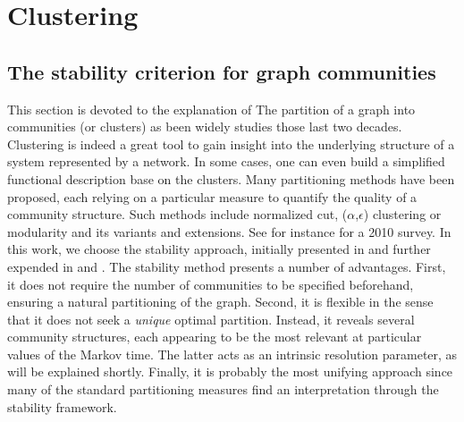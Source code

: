 \chapter{Clustering}
\section{The stability criterion for graph communities}
This section is devoted to the explanation of 
The partition of a graph into communities (or clusters) as been widely studies those last two decades. Clustering is indeed a great tool to gain insight into the underlying structure of a system represented by a network. In some cases, one can even build a simplified functional description base on the clusters. Many partitioning methods have been proposed, each relying on a particular measure to quantify the quality of a community structure. Such methods include normalized cut, ($\alpha$,$\epsilon$) clustering or modularity and its variants and extensions. See for instance \cite{fortunato2010community} for a 2010 survey. In this work, we choose the stability approach, initially presented in \cite{delvenne2010stability} and further expended in \cite{lambiotte2009laplacian} and \cite{delvenne2013stability}. The stability method presents a number of advantages. First, it does not require the number of communities to be specified beforehand, ensuring a natural partitioning of the graph. Second, it is flexible in the sense that it does not seek a \textit{unique} optimal partition. Instead, it reveals several community structures, each appearing to be the most relevant at particular values of the Markov time. The latter acts as an intrinsic resolution parameter, as will be explained shortly. Finally, it is probably the most unifying approach since many of the standard partitioning measures find an interpretation through the stability framework.

